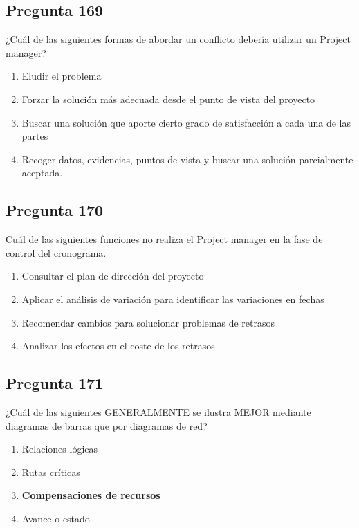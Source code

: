 \documentclass[11pt,a4paper]{article}
\begin{document}
\subsection*{Pregunta 169}
¿Cuál de las siguientes formas de abordar un conflicto debería utilizar un Project manager?

\begin{enumerate}[label=\alph*)]
  \item Eludir el problema
  \item Forzar la solución más adecuada desde el punto de vista del proyecto
  \item Buscar una solución que aporte cierto grado de satisfacción a cada una de las partes
  \item Recoger datos, evidencias, puntos de vista y buscar una solución parcialmente aceptada.
\end{enumerate}

\subsection*{Pregunta 170}
Cuál de las siguientes funciones no realiza el Project manager en la fase de control del cronograma.

\begin{enumerate}[label=\alph*)]
  \item Consultar el plan de dirección del proyecto
  \item Aplicar el análisis de variación para identificar las variaciones en fechas
  \item Recomendar cambios para solucionar problemas de retrasos
  \item Analizar los efectos en el coste de los retrasos
\end{enumerate}

\subsection*{Pregunta 171}
¿Cuál de las siguientes GENERALMENTE se ilustra MEJOR mediante diagramas de barras que por diagramas de red?

\begin{enumerate}[label=\alph*)]
  \item Relaciones lógicas
  \item Rutas críticas
  \item \textbf{Compensaciones de recursos}
  \item Avance o estado
\end{enumerate}
\end{document}

